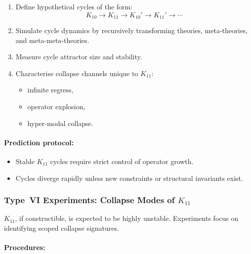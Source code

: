 \begin{enumerate}
    \item Define hypothetical cycles of the form:
          \[
              K_{10}
                \longrightarrow
              K_{11}
                \longrightarrow
              K_{10}'
                \longrightarrow
              K_{11}'
                \longrightarrow \cdots
          \]
    \item Simulate cycle dynamics by recursively transforming
          theories, meta-theories, and meta-meta-theories.
    \item Measure cycle attractor size and stability.
    \item Characterise collapse channels unique to $K_{11}$:
          \begin{itemize}
              \item infinite regress,
              \item operator explosion,
              \item hyper-modal collapse.
          \end{itemize}
\end{enumerate}

\paragraph{Prediction protocol:}

\begin{itemize}
    \item Stable $K_{11}$ cycles require strict control of
          operator growth.
    \item Cycles diverge rapidly unless new constraints or
          structural invariants exist.
\end{itemize}



\subsubsection{Type~VI Experiments: Collapse Modes of $K_{11}$}

$K_{11}$, if constructible, is expected to be highly unstable.
Experiments focus on identifying scoped collapse signatures.

\paragraph{Procedures:}

